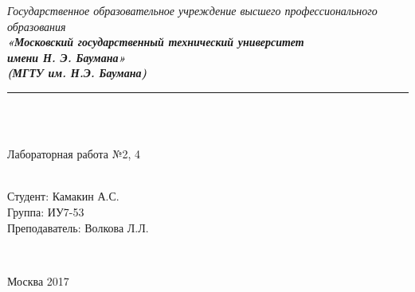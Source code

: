 \documentclass[utf8x, 12pt]{G7-32} %
\begin{document}
\frontmatter %



\begin{center}
	\hfill \break
	\textit{
		\normalsize{Государственное образовательное учреждение высшего профессионального образования}}\\ 
	
	\textit{
		\normalsize  {\bf  «Московский государственный технический университет}\\ 
		\normalsize  {\bf имени Н. Э. Баумана»}\\
		\normalsize  {\bf (МГТУ им. Н.Э. Баумана)}\\
	}
	\noindent\rule{\textwidth}{2pt}
	\hfill \break
	\noindent
	\\
	\noindent
	\\
	\hfill\break
	\hfill \break
	\hfill \break
	\hfill \break
	
	\hfill \break
	\large{Лабораторная работа №2, 4\\ }\\
	\hfill \break
	\hfill \break
	\hfill \break
	\hfill \break
	\hfill \break	
	\normalsize {
		\begin{minipage}[t]{7cm}
		\end{minipage}
		\hfill
		\begin{minipage}[t]{7cm}
			\flushright
			Студент: Камакин А.С.\\
			Группа: ИУ7-53\\
			Преподаватель: Волкова Л.Л.
		\end{minipage}
	}\\
	\hfill \break	
	\hfill \break
	\hfill \break
	\hfill \break
	\hfill \break
\end{center}
\hfill \break
\hfill \break
\begin{center} Москва 2017 \end{center}

\thispagestyle{empty} %

\newpage

\mainmatter %
\end{document}
